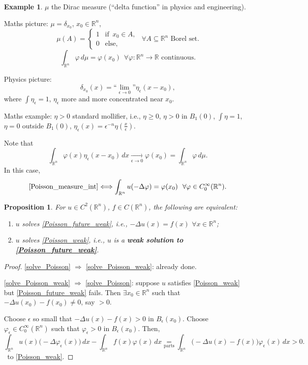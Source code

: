 \documentclass[12pt]{article}
\newtheorem{proposition}{Proposition}[section]
\theoremstyle{definition}
\newtheorem{example}{Example}
\begin{document}
\begin{example}
$\mu$ the Dirac measure (``delta function'' in physics and engineering).

Maths picture: $\mu=\delta_{x_0}$, $x_0\in\mathbb{R}^n$,
\[\mu(A)=\left\{\begin{array}{ll}1&\text{if }\,x_0\in A,\\0&\text{else},\end{array}\right.\ \ \forall A\subseteq\mathbb{R}^n\text{ Borel set}.\]
\[\int_{\mathbb{R}^n}\varphi\,d\mu=\varphi(x_0)\ \ \forall\varphi:\mathbb{R}^n\rightarrow\mathbb{R}\text{ continuous}.\]

Physics picture:
\[\delta_{x_0}(x)=\text{``}\lim_{\epsilon\to0}\text{''}\eta_{\epsilon}(x-x_0),\]
where $\int\eta_{\epsilon}=1$, $\eta_{\epsilon}$ more and more concentrated near $x_0$.

Maths example: $\eta>0$ standard mollifier, i.e., $\eta\geq0$, $\eta>0$ in $B_1(0)$, $\int\eta=1$, $\eta=0$ outside $B_1(0)$, $\eta_{\epsilon}(x)=\epsilon^{-n}\eta(\frac{x}{\epsilon})$.

Note that
\[\int_{\mathbb{R}^n}\varphi(x)\eta_{\epsilon}(x-x_0)\,dx\xrightarrow[\epsilon\to0]{}\varphi(x_0)=\int_{\mathbb{R}^n}\varphi\,d\mu.\]
In this case,
\[\text{\eqref{Poisson_measure_int}}\Longleftrightarrow\int_{\mathbb{R}^n}u(-\Delta\varphi)=\varphi(x_0)\ \ \forall\varphi\in C_0^{\infty}(\mathbb{R}^n).\]
\end{example}

\begin{proposition}\label{Poisson_iff_weak}
For $u\in C^2(\mathbb{R}^n)$, $f\in C(\mathbb{R}^n)$, the following are equivalent:
\begin{enumerate}[label=(\roman*)]
\item\label{solve_Poisson} $u$ solves \eqref{Poisson_future_weak}, i.e., $-\Delta u(x)=f(x)$ $\forall x\in\mathbb{R}^n$;
\item\label{solve_Poisson_weak} $u$ solves \eqref{Poisson_weak}, i.e., $u$ is a \textbf{weak solution to \eqref{Poisson_future_weak}}.
\end{enumerate}
\end{proposition}

\begin{proof}
\ref{solve_Poisson} $\Rightarrow$ \ref{solve_Poisson_weak}: already done.

\ref{solve_Poisson_weak} $\Rightarrow$ \ref{solve_Poisson}: suppose $u$ satisfies \eqref{Poisson_weak} but \eqref{Poisson_future_weak} fails. Then $\exists x_0\in\mathbb{R}^n$ such that $-\Delta u(x_0)-f(x_0)\neq0$, say $>0$.

Choose $\epsilon$ so small that $-\Delta u(x)-f(x)>0$ in $B_{\epsilon}(x_0)$. Choose $\varphi_{\epsilon}\in C_0^{\infty}(\mathbb{R}^n)$ such that $\varphi_{\epsilon}>0$ in $B_{\epsilon}(x_0)$. Then,
\[\int_{\mathbb{R}^n}u(x)\big(-\Delta\varphi_{\epsilon}(x)\big)\,dx-\int_{\mathbb{R}^n}f(x)\varphi(x)\,dx\underset{\text{parts}}{=}\int_{\mathbb{R}^n}\big(-\Delta u(x)-f(x)\big)\varphi_{\epsilon}(x)\,dx>0.\]
\Lightning\  to \eqref{Poisson_weak}.
\end{proof}
\end{document}
